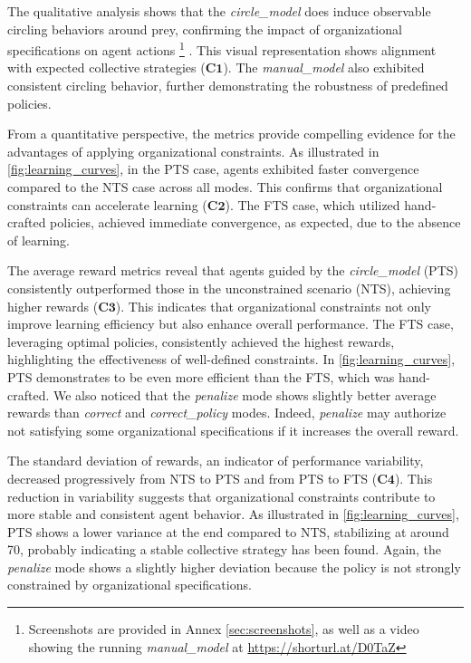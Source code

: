 \documentclass[runningheads]{llncs}
\theoremstyle{freethm}
\theoremstyle{proofoutline}
\begin{document}
%
%
The qualitative analysis shows that the \textit{circle\_model} does induce observable circling behaviors around prey, confirming the impact of organizational specifications on agent actions%
\footnote{Screenshots are provided in Annex \ref{sec:screenshots}, as well as a video showing the running \textit{manual\_model} at \url{https://shorturl.at/D0TaZ}}%
. This visual representation shows alignment with expected collective strategies ($\mathbf{C1}$). The \textit{manual\_model} also exhibited consistent circling behavior, further demonstrating the robustness of predefined policies.

From a quantitative perspective, the metrics provide compelling evidence for the advantages of applying organizational constraints. As illustrated in \autoref{fig:learning_curves}, in the PTS case, agents exhibited faster convergence compared to the NTS case across all modes. This confirms that organizational constraints can accelerate learning ($\mathbf{C2}$). The FTS case, which utilized hand-crafted policies, achieved immediate convergence, as expected, due to the absence of learning.

The average reward metrics reveal that agents guided by the \textit{circle\_model} (PTS) consistently outperformed those in the unconstrained scenario (NTS), achieving higher rewards ($\mathbf{C3}$). This indicates that organizational constraints not only improve learning efficiency but also enhance overall performance. The FTS case, leveraging optimal policies, consistently achieved the highest rewards, highlighting the effectiveness of well-defined constraints. In \autoref{fig:learning_curves}, PTS demonstrates to be even more efficient than the FTS, which was hand-crafted. We also noticed that the \textit{penalize} mode shows slightly better average rewards than \textit{correct} and \textit{correct\_policy} modes. Indeed, \textit{penalize} may authorize not satisfying some organizational specifications if it increases the overall reward.

The standard deviation of rewards, an indicator of performance variability, decreased progressively from NTS to PTS and from PTS to FTS ($\mathbf{C4}$). This reduction in variability suggests that organizational constraints contribute to more stable and consistent agent behavior. As illustrated in \autoref{fig:learning_curves}, PTS shows a lower variance at the end compared to NTS, stabilizing at around 70, probably indicating a stable collective strategy has been found. Again, the \textit{penalize} mode shows a slightly higher deviation because the policy is not strongly constrained by organizational specifications.
\end{document}
